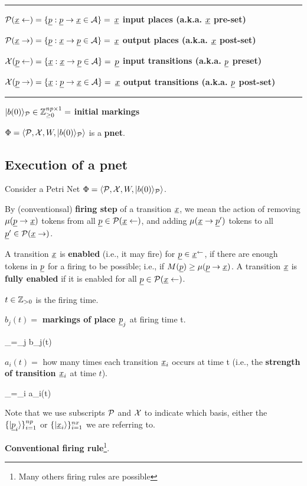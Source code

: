 \hrule
$\calp(\rvx\larrow) = \{\rvp : \rvp \rarrow \rvx\in\cala\}=$ {\bf $\rvx$ input places (a.k.a. $\rvx$ pre-set)}

$\calp(\rvx\rarrow) = \{\rvp : \rvx \rarrow \rvp \in \cala\}=$ {\bf $\rvx$ output places (a.k.a. $\rvx$ post-set)}

$\calx(\rvp\larrow) = \{\rvx : \rvx \rarrow \rvp \in \cala \}=$ {\bf$\rvp$ input transitions (a.k.a. $\rvp$ preset)}

$\calx(\rvp\rarrow) = \{\rvx : \rvp \rarrow\rvx \in\cala\}=$ {\bf $\rvx$ output transitions (a.k.a. $\rvp$ post-set)}

\hrule
$|b(0)\rangle_{\cal P}\in {\mathbb{Z}}_{\geq 0}^{np\times 1} =$ {\bf initial markings}

$\Phi = \left\langle{\cal P}, {\cal X}, W,|b(0)\rangle_{\cal P}\right\rangle$ is a {\bf pnet}.
\subsection{Execution of a pnet}
Consider a Petri Net $\Phi = \left\langle{\cal P}, {\cal X}, W,|b(0)\rangle_{\cal P}\right\rangle$.

By (conventionsal) {\bf firing step} of a transition $\rvx$, we mean the action of removing $\mu(\rvp\rarrow \rvx)$
tokens from all $\rvp\in\calp(\rvx\larrow)$, and adding $\mu(\rvx\rarrow\rvp')$ tokens to all $\rvp'\in\calp(\rvx\rarrow)$.

A transition $\rvx$ is {\bf enabled} 
(i.e., it may fire)
for $\rvp\in \rvx^{\larrow}$, if there are enough tokens in 
$\rvp$ for a firing to be possible; i.e., if $M(\rvp) \geq \mu(\rvp\rarrow \rvx)$. A transition $\rvx$ is {\bf fully enabled} if it is enabled for all $\rvp\in \calp(\rvx\larrow)$.

$t \in {\mathbb{Z}}_{>0}$ is the firing time.

$b_j(t) =$ {\bf markings of place $\rvp_j$} at firing time t.

\beq
{}_\calp =\sum_j b_j(t) 
\eeq

$a_i(t) =$ how many times each transition $\rvx_i$
occurs at time t
(i.e., the {\bf strength of transition $\rvx_i$}
at time $t$).

\beq
{}_\calx =\sum_i a_i(t) 
\eeq

Note that we use subscripts ${\cal P}$ and ${\cal X}$ to
indicate which basis, either the $\{\ket{\rvp_i}\}_{i=1}^{np}$
or  $\{\ket{\rvx_i}\}_{i=1}^{nx}$
we are referring to.

{\bf Conventional firing rule}\footnote{Many others firing rules are possible}.

